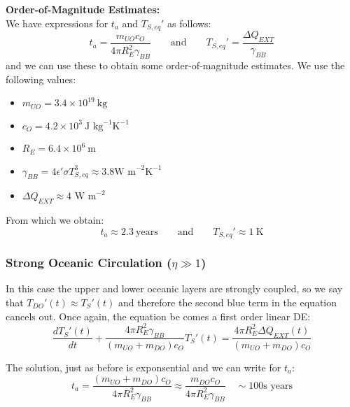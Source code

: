 \begin{tcolorbox}
    \textbf{Order-of-Magnitude Estimates:}\\
    We have expressions for $t_a$ and $T_{S,eq}'$ as follows:
    \begin{equation}
        t_a = \frac{m_{UO}c_O}{4\pi R_E^2 \gamma_{BB}} \quad \quad \text{and}
        \quad \quad T_{S,eq}' = \frac{\Delta Q_{EXT}}{\gamma_{BB}} \nonumber
    \end{equation}
    and we can use these to obtain some order-of-magnitude estimates. We use the
    following values:
    \begin{itemize}
        \item $m_{UO} = 3.4 \times 10^{19}\ \text{kg}$
        \item $c_O = 4.2 \times 10^3\ \text{J kg}^{-1} \text{K}^{-1}$
        \item $R_E = 6.4 \times 10^6\ \text{m}$
        \item $\gamma_{BB} = 4\epsilon' \sigma T_{S,eq}^3 \approx 3.8 
        \text{W m}^{-2} \text{K}^{-1}$
        \item $\Delta Q_{EXT} \approx 4\text{ W m}^{-2}$
    \end{itemize}

    \noindent From which we obtain:
    \begin{equation}
        t_a \approx 2.3\ \text{years} \quad \quad \text{and}
        \quad \quad T_{S,eq}' \approx 1\ \text{K} \nonumber
    \end{equation}

\end{tcolorbox}

\subsubsection{Strong Oceanic Circulation ($\eta \gg 1$)}
\label{sec:strong-oceanic-circulation}

In this case the upper and lower oceanic layers are strongly coupled, so we say
that $T_{DO}'(t) \approx T_S'(t)$ and therefore the second blue term in the 
equation cancels out. Once again, the equation be comes a first order linear
DE:
$$
\frac{dT_S'(t)}{dt} + \frac{4\pi R_E^2 \gamma_{BB}}{(m_{UO} + m_{DO})c_O} T_S'(t)
= \frac{4\pi R_E^2 \Delta Q_{EXT}(t)}{(m_{UO} + m_{DO})c_O}
$$

The solution, just as before is exponsential and we can write for $t_a$:
$$
\boxed{t_a = \frac{(m_{UO} + m_{DO})c_O}{4\pi R_E^2 \gamma_{BB}} \approx 
\frac{m_{DO}c_O}{4\pi R_E^2 \gamma_{BB}}} \quad \sim 100\text{s years}
$$

